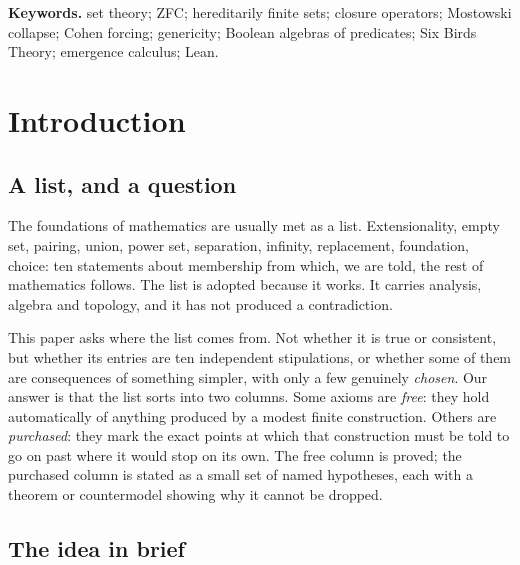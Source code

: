 \documentclass[11pt]{article}
\theoremstyle{definition}
\begin{document}
\medskip
\noindent\textbf{Keywords.} set theory; ZFC; hereditarily finite sets; closure operators; Mostowski collapse; Cohen forcing; genericity; Boolean algebras of predicates; Six Birds Theory; emergence calculus; Lean.

\section{Introduction}\label{sec:intro}

\subsection{A list, and a question}

The foundations of mathematics are usually met as a list. Extensionality, empty set, pairing,
union, power set, separation, infinity, replacement, foundation, choice: ten statements about
membership \citep{Zermelo1908, Fraenkel1922} from which, we are told, the rest of mathematics
follows. The list is adopted because it works. It carries analysis, algebra and topology, and it
has not produced a contradiction.

This paper asks where the list comes from. Not whether it is true or consistent, but whether its
entries are ten independent stipulations, or whether some of them are consequences of something
simpler, with only a few genuinely \emph{chosen}. Our answer is that the list sorts into two
columns. Some axioms are \emph{free}: they hold automatically of anything produced by a modest
finite construction. Others are \emph{purchased}: they mark the exact points at which that
construction must be told to go on past where it would stop on its own. The free column is
proved; the purchased column is stated as a small set of named hypotheses, each with a theorem
or countermodel showing why it cannot be dropped.

\subsection{The idea in brief}
\end{document}
